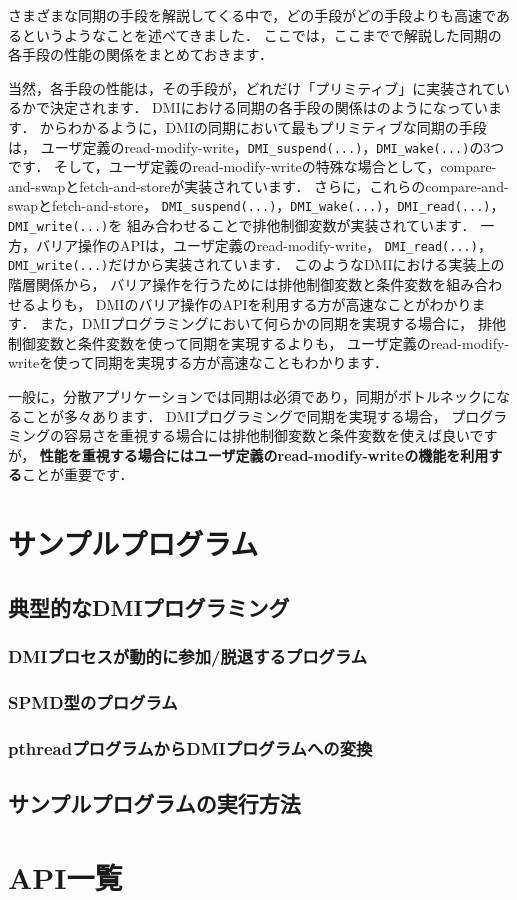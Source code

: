 \documentclass[report,12pt]{jsbook}
\begin{document}
さまざまな同期の手段を解説してくる中で，どの手段がどの手段よりも高速であるというようなことを述べてきました．
ここでは，ここまでで解説した同期の各手段の性能の関係をまとめておきます．

当然，各手段の性能は，その手段が，どれだけ「プリミティブ」に実装されているかで決定されます．
DMIにおける同期の各手段の関係はのようになっています．
からわかるように，DMIの同期において最もプリミティブな同期の手段は，
ユーザ定義のread-modify-write，\texttt{DMI\_suspend(...)}，\texttt{DMI\_wake(...)}の3つです．
そして，ユーザ定義のread-modify-writeの特殊な場合として，compare-and-swapとfetch-and-storeが実装されています．
さらに，これらのcompare-and-swapとfetch-and-store，
\texttt{DMI\_suspend(...)}，\texttt{DMI\_wake(...)}，\texttt{DMI\_read(...)}，\texttt{DMI\_write(...)}を
組み合わせることで排他制御変数が実装されています．
一方，バリア操作のAPIは，ユーザ定義のread-modify-write，
\texttt{DMI\_read(...)}，\texttt{DMI\_write(...)}だけから実装されています．
このようなDMIにおける実装上の階層関係から，
バリア操作を行うためには排他制御変数と条件変数を組み合わせるよりも，
DMIのバリア操作のAPIを利用する方が高速なことがわかります．
また，DMIプログラミングにおいて何らかの同期を実現する場合に，
排他制御変数と条件変数を使って同期を実現するよりも，
ユーザ定義のread-modify-writeを使って同期を実現する方が高速なこともわかります．

一般に，分散アプリケーションでは同期は必須であり，同期がボトルネックになることが多々あります．
DMIプログラミングで同期を実現する場合，
プログラミングの容易さを重視する場合には排他制御変数と条件変数を使えば良いですが，
\textbf{性能を重視する場合にはユーザ定義のread-modify-writeの機能を利用する}ことが重要です．

\chapter{サンプルプログラム}

\section{典型的なDMIプログラミング}

\subsection{DMIプロセスが動的に参加/脱退するプログラム}

\subsection{SPMD型のプログラム}

\subsection{pthreadプログラムからDMIプログラムへの変換}

\section{サンプルプログラムの実行方法}


\chapter{API一覧}
\end{document}
